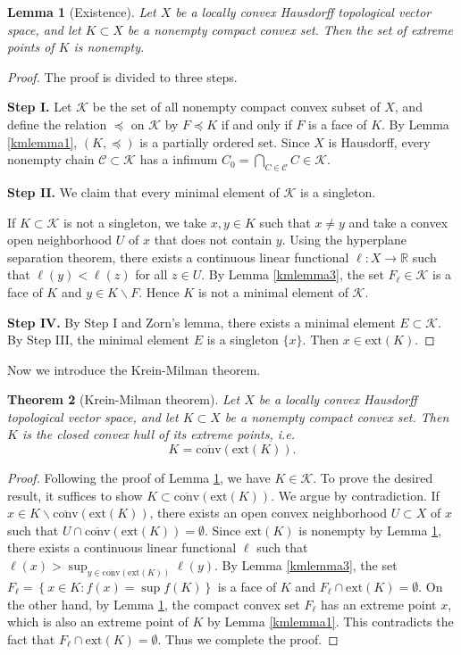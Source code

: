 \documentclass{article}
\numberwithin{equation}{section}
\newcommand{\bbR}{\mathbb{R}}
\newcommand{\scr}{\mathscr}
\newcommand{\ol}{\overline}
\theoremstyle{plain}
\newtheorem{theorem}{Theorem}[section]
\newtheorem{lemma}[theorem]{Lemma}
\theoremstyle{definition}
\begin{document}
\begin{lemma}[Existence]\label{kmlemma2}
	Let $X$ be a locally convex Hausdorff topological vector space, and let $K\subset X$ be a nonempty compact convex set. Then the set of extreme points of $K$ is nonempty.
\end{lemma}
\begin{proof}
	The proof is divided to three steps.
	\item \textbf{Step I.} Let $\scr{K}$ be the set of all nonempty compact convex subset of $X$, and define the relation $\preceq$ on $\scr{K}$ by $F\preceq K$ if and only if $F$ is a face of $K$. By Lemma \ref{kmlemma1}, $(K,\preceq)$ is a partially ordered set. Since $X$ is Hausdorff, every nonempty chain $\scr{C}\subset\scr{K}$ has a infimum $C_0=\bigcap_{C\in\scr{C}}C\in\mathscr{K}$.
	\item \textbf{Step II.} We claim that every minimal element of $\scr{K}$ is a singleton. 
	
	If $K\subset\scr{K}$ is not a singleton, we take $x,y\in K$ such that $x\neq y$ and take a convex open neighborhood $U$ of $x$ that does not contain $y$. Using the hyperplane separation theorem, there exists a continuous linear functional $\ell:X\to\bbR$ such that $\ell(y)<\ell(z)$ for all $z\in U$. By Lemma \ref{kmlemma3}, the set $F_\ell\in\scr{K}$ is a face of $K$ and $y\in K\backslash F$. Hence $K$ is not a minimal element of $\scr{K}$.
	
	\item \textbf{Step IV.} By Step I and Zorn's lemma, there exists a minimal element $E\subset\scr{K}$. By Step III, the minimal element $E$ is a singleton $\{x\}$. Then $x\in\mathrm{ext}(K)$.
\end{proof}

Now we introduce the Krein-Milman theorem.
\begin{theorem}[Krein-Milman theorem]
	Let $X$ be a locally convex Hausdorff topological vector space, and let $K\subset X$ be a nonempty compact convex set. Then $K$ is the closed convex hull of its extreme points, i.e. $$K=\ol{\mathrm{conv}}(\mathrm{ext}(K)).$$
\end{theorem}
\begin{proof}
	Following the proof of Lemma \ref{kmlemma2}, we have $K\in\scr{K}$. To prove the desired result, it suffices to show $K\subset\ol{\mathrm{conv}}(\mathrm{ext}(K))$. We argue by contradiction. If  $x\in K\backslash\ol{\mathrm{conv}}(\mathrm{ext}(K))$, there exists an open convex neighborhood $U\subset X$ of $x$ such that $U\cap \ol{\mathrm{conv}}(\mathrm{ext}(K))=\emptyset$. Since $\mathrm{ext}(K)$ is nonempty by Lemma \ref{kmlemma2}, there exists a continuous linear functional $\ell$ such that $\ell(x)>\sup_{y\in\ol{\mathrm{conv}}(\mathrm{ext}(K))} \ell(y)$.  By Lemma \ref{kmlemma3}, the set $F_\ell=\left\{x\in K:f(x)=\sup f(K)\right\}$ is a face of $K$ and $F_\ell\cap\mathrm{ext}(K)=\emptyset$. On the other hand, by Lemma \ref{kmlemma2}, the compact convex set $F_\ell$ has an extreme point $x$, which is also an extreme point of $K$ by Lemma \ref{kmlemma1}. This contradicts the fact that $F_\ell\cap\mathrm{ext}(K)=\emptyset$. Thus we complete the proof.
\end{proof}
\end{document}
